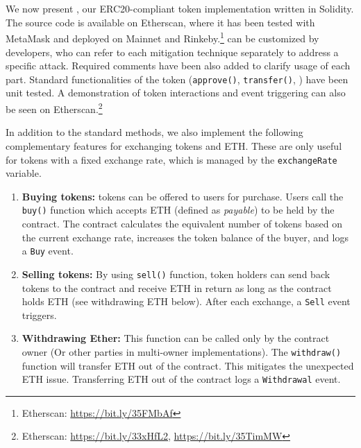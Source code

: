 
\section{\sys}\label{sec:proposal}

We now present \sys, our ERC20-compliant token implementation written in Solidity. The source code is available on Etherscan, where it has been tested with MetaMask and deployed on Mainnet and Rinkeby.\footnote{Etherscan: \url{https://bit.ly/35FMbAf}} \sys can be customized by developers, who can refer to each mitigation technique separately to address a specific attack. Required comments have been also added to clarify usage of each part. Standard functionalities of the token (\ie \texttt{approve()}, \texttt{transfer()}, \etc) have been unit tested. A demonstration of token interactions and event triggering can also be seen on Etherscan.\footnote{Etherscan: \url{https://bit.ly/33xHfL2}, \url{https://bit.ly/35TimMW}} 


In addition to the standard \erc methods, we also implement the following complementary features for exchanging tokens and ETH. These are only useful for tokens with a fixed exchange rate, which is managed by the \texttt{exchangeRate} variable.  

\begin{enumerate}
	\item \textbf{Buying tokens:} \erc tokens can be offered to users for purchase. Users call the \texttt{buy()} function which accepts ETH (\ie defined as \textit{payable}) to be held by the \erc contract. The contract calculates the equivalent number of tokens based on the current exchange rate, increases the token balance of the buyer, and logs a \texttt{Buy} event.
	\item \textbf{Selling tokens:} By using \texttt{sell()} function, token holders can send back tokens to the contract and receive ETH in return as long as the contract holds ETH (see withdrawing ETH below). After each exchange, a \texttt{Sell} event triggers. 
	\item \textbf{Withdrawing Ether:} This function can be called only by the contract owner {\chg (Or other parties in multi-owner implementations)}. The \texttt{withdraw()} function will transfer ETH out of the contract. This mitigates the unexpected ETH issue. Transferring ETH out of the contract logs a \texttt{Withdrawal} event.
\end{enumerate}

